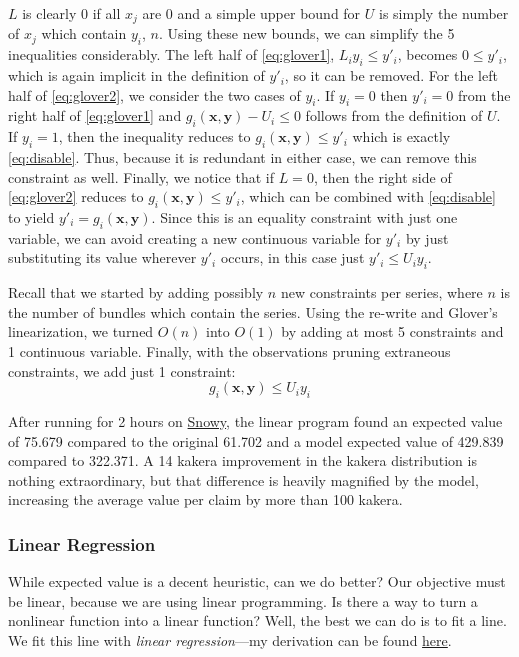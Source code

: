 \documentclass[11pt, oneside]{article}
\theoremstyle{plain}
\theoremstyle{definition}
\begin{document}
\( L \) is clearly 0 if all \( x_j \) are 0 and a simple upper bound for \( U
\) is simply the number of \( x_j \) which contain \( y_i \), \( n \). Using
these new bounds, we can simplify the 5 inequalities considerably. The left
half of \eqref{eq:glover1}, \( L_i y_i \leq y'_i \), becomes \( 0 \leq y'_i
\), which is again implicit in the definition of \( y'_i \), so it can be
removed. For the left half of \eqref{eq:glover2}, we consider the two cases
of \( y_i \). If \( y_i = 0 \) then \( y'_i = 0 \) from the right half of
\eqref{eq:glover1} and \( g_i(\bm{x}, \bm{y}) - U_i \leq 0 \) follows from
the definition of \( U \). If \( y_i = 1 \), then the inequality reduces to
\( g_i(\bm{x}, \bm{y}) \leq y'_i \) which is exactly \eqref{eq:disable}.
Thus, because it is redundant in either case, we can remove this constraint
as well. Finally, we notice that if \( L = 0 \), then the right side of
\eqref{eq:glover2} reduces to \( g_i(\bm{x}, \bm{y}) \leq y'_i \), which can
be combined with \eqref{eq:disable} to yield \( y'_i = g_i(\bm{x}, \bm{y}) \).
Since this is an equality constraint with just one variable, we can avoid
creating a new continuous variable for \( y'_i \) by just substituting its
value wherever \( y'_i \) occurs, in this case just \( y'_i \leq U_i y_i \).

Recall that we started by adding possibly \( n \) new constraints per series,
where \( n \) is the number of bundles which contain the series. Using the
re-write and Glover's linearization, we turned \( O(n) \) into \( O(1) \) by
adding at most 5 constraints and 1 continuous variable. Finally, with the
observations pruning extraneous constraints, we add just 1 constraint:
\[ g_i(\bm{x}, \bm{y}) \leq U_i y_i \]

After running for 2 hours on
\href{https://documentation.tjhsst.edu/machines/other/snowy}{Snowy}, the
linear program found an expected value of 75.679 compared to the original
61.702 and a model expected value of 429.839 compared to 322.371. A 14
kakera improvement in the kakera distribution is nothing extraordinary,
but that difference is heavily magnified by the model, increasing
the average value per claim by more than 100 kakera.

\subsubsection{Linear Regression}

While expected value is a decent heuristic, can we do better? Our objective must
be linear, because we are using linear programming. Is there a way to turn a nonlinear
function into a linear function? Well, the best we can do is to fit a line. We fit
this line with \textit{linear regression}---my derivation can be found 
\href{https://activities.tjhsst.edu/computervision/lectures/Tensor_Calculus.pdf}{here}. 
\end{document}
